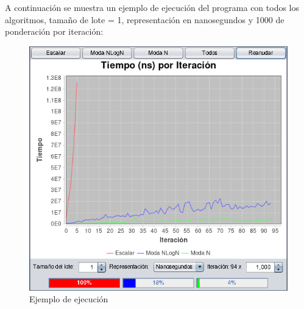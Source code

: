 A continuación se muestra un ejemplo de ejecución del programa con todos los algoritmos, tamaño de lote = 1, representación en nanosegundos y 1000 de ponderación por iteración:
\begin{figure}[!h]
    \centering
    \includegraphics[width=\linewidth]{Usage/img/example_execution.png}
    \caption{Ejemplo de ejecución}
    \label{fig:example_execution}
\end{figure}